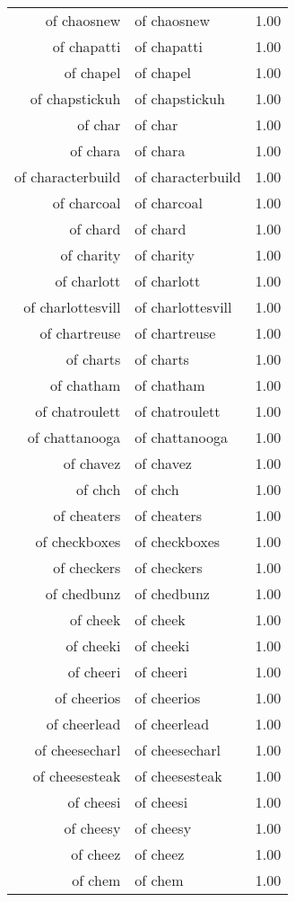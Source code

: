 \begin{table}[ht]
\begin{tabular}{rlr}
  of chaosnew & of chaosnew & 1.00 \\ 
  of chapatti & of chapatti & 1.00 \\ 
  of chapel & of chapel & 1.00 \\ 
  of chapstickuh & of chapstickuh & 1.00 \\ 
  of char & of char & 1.00 \\ 
  of chara & of chara & 1.00 \\ 
  of characterbuild & of characterbuild & 1.00 \\ 
  of charcoal & of charcoal & 1.00 \\ 
  of chard & of chard & 1.00 \\ 
  of charity & of charity & 1.00 \\ 
  of charlott & of charlott & 1.00 \\ 
  of charlottesvill & of charlottesvill & 1.00 \\ 
  of chartreuse & of chartreuse & 1.00 \\ 
  of charts & of charts & 1.00 \\ 
  of chatham & of chatham & 1.00 \\ 
  of chatroulett & of chatroulett & 1.00 \\ 
  of chattanooga & of chattanooga & 1.00 \\ 
  of chavez & of chavez & 1.00 \\ 
  of chch & of chch & 1.00 \\ 
  of cheaters & of cheaters & 1.00 \\ 
  of checkboxes & of checkboxes & 1.00 \\ 
  of checkers & of checkers & 1.00 \\ 
  of chedbunz & of chedbunz & 1.00 \\ 
  of cheek & of cheek & 1.00 \\ 
  of cheeki & of cheeki & 1.00 \\ 
  of cheeri & of cheeri & 1.00 \\ 
  of cheerios & of cheerios & 1.00 \\ 
  of cheerlead & of cheerlead & 1.00 \\ 
  of cheesecharl & of cheesecharl & 1.00 \\ 
  of cheesesteak & of cheesesteak & 1.00 \\ 
  of cheesi & of cheesi & 1.00 \\ 
  of cheesy & of cheesy & 1.00 \\ 
  of cheez & of cheez & 1.00 \\ 
  of chem & of chem & 1.00 \\ 

\end{tabular}
\end{table}
